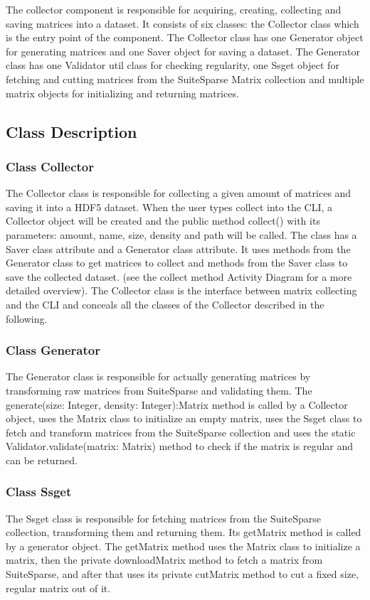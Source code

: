 \documentclass[parskip=full]{scrartcl}
\begin{document}
The collector component is responsible for acquiring, creating, collecting and saving matrices into a dataset.
It consists of six classes:
the Collector class which is the entry point of the component. The Collector class has one Generator object for generating matrices and one Saver object for saving a dataset.
The Generator class has one Validator util class for checking regularity, one Ssget object for fetching and cutting matrices from the SuiteSparse Matrix collection and multiple matrix objects for initializing and returning matrices.

\subsection{Class Description}

\subsubsection{Class Collector}
The Collector class is responsible for collecting a given amount of matrices and saving it into a \gls{HDF5} dataset.
When the user types collect into the CLI, a Collector object will be created and the public method collect() with its parameters:
amount, name, size, density and path
will be called. 
The class has a Saver class attribute and a Generator class attribute.
It uses methods from the Generator class to get matrices to collect and methods from the Saver class to save the collected dataset.
(see the collect method Activity Diagram for a more detailed overview).
The Collector class is the interface between matrix collecting and the CLI and conceals all the classes of the Collector described in the following.

\subsubsection{Class Generator}
The Generator class is responsible for actually generating matrices by transforming raw matrices from SuiteSparse and validating them.
The generate(size: Integer, density: Integer):Matrix method is called by a Collector object, uses the Matrix class to initialize an empty matrix, uses the Ssget class to fetch and transform matrices from the SuiteSparse collection and uses the static Validator.validate(matrix: Matrix)  method to check if the matrix is regular and can be returned.

\subsubsection{Class Ssget}
The Ssget class is responsible for fetching matrices from the SuiteSparse collection, transforming them and returning them.
Its getMatrix method is called by a generator object.
The getMatrix method uses the Matrix class to initialize a matrix, then the private downloadMatrix method to fetch a matrix from SuiteSparse, and after that uses its private cutMatrix method to cut a fixed size, regular matrix out of it.
\end{document}
